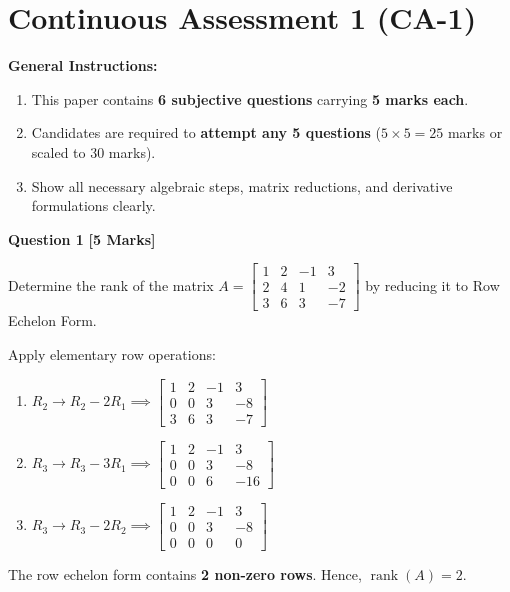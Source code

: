 \section{Continuous Assessment 1 (CA-1)}


\noindent
\textbf{General Instructions:}
\begin{enumerate}[topsep=2pt,itemsep=1pt]
    \item This paper contains \textbf{6 subjective questions} carrying \textbf{5 marks each}.
    \item Candidates are required to \textbf{attempt any 5 questions} ($5 \times 5 = 25$ marks or scaled to 30 marks).
    \item Show all necessary algebraic steps, matrix reductions, and derivative formulations clearly.
\end{enumerate}
\vspace{3mm}

\noindent\textbf{Question 1} \hfill \textbf{[5 Marks]}

Determine the rank of the matrix $A = \begin{bmatrix} 1 & 2 & -1 & 3 \\ 2 & 4 & 1 & -2 \\ 3 & 6 & 3 & -7 \end{bmatrix}$ by reducing it to Row Echelon Form.

\begin{solbox}
Apply elementary row operations:
\begin{enumerate}
    \item $R_2 \to R_2 - 2R_1 \implies \begin{bmatrix} 1 & 2 & -1 & 3 \\ 0 & 0 & 3 & -8 \\ 3 & 6 & 3 & -7 \end{bmatrix}$
    \item $R_3 \to R_3 - 3R_1 \implies \begin{bmatrix} 1 & 2 & -1 & 3 \\ 0 & 0 & 3 & -8 \\ 0 & 0 & 6 & -16 \end{bmatrix}$
    \item $R_3 \to R_3 - 2R_2 \implies \begin{bmatrix} 1 & 2 & -1 & 3 \\ 0 & 0 & 3 & -8 \\ 0 & 0 & 0 & 0 \end{bmatrix}$
\end{enumerate}
The row echelon form contains \textbf{2 non-zero rows}. Hence, $\operatorname{rank}(A) = 2$.
\end{solbox}

